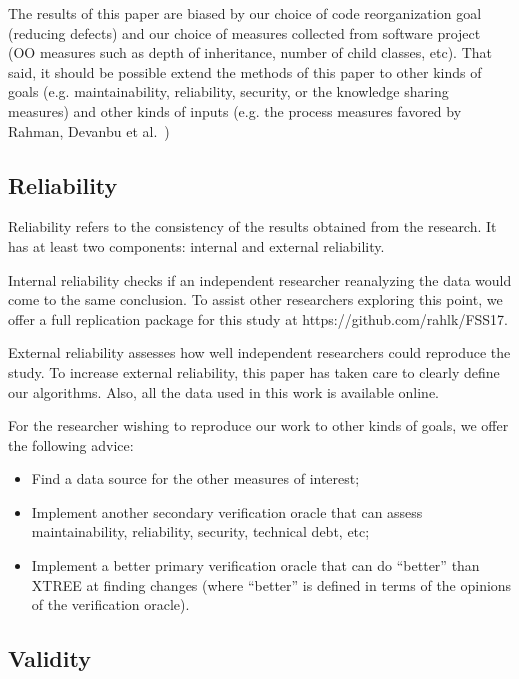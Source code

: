 \documentclass[sigconf, proceedings, 9pt]{acmart}
\begin{document}
\label{sect:valid}



The results of this paper are biased by our choice of code reorganization
goal (reducing defects) and our choice of measures collected from software
project (OO measures such as depth of inheritance, number of child classes,
etc). That said, it should be possible extend the methods of this paper to 
other
kinds of goals (e.g. maintainability, reliability, security, or the 
knowledge sharing
measures) and other kinds of
inputs (e.g. the process measures favored by Rahman,
Devanbu et al.~\cite{Rahman2013})

\subsection{Reliability}
Reliability refers to the consistency of the results obtained
from the research. It has at least two components: internal
and external reliability.

Internal reliability checks if an independent researcher
reanalyzing the data would come to the same conclusion.
To assist other researchers exploring this point, we offer a full 
replication package for this study at
https://github.com/rahlk/FSS17.

External reliability assesses how well independent researchers
could reproduce the study. To increase external
reliability, this paper has taken care to clearly define our
algorithms. Also, all the data used in this work is available
online.

For the researcher wishing to reproduce our work to other kinds of goals, 
we offer the following advice:

\begin{itemize}
\item Find a data source for the other measures of interest;
\item Implement another secondary verification oracle that can assess 
maintainability, reliability, security, technical debt, etc;
\item Implement a better primary verification oracle that can do ``better'' 
than XTREE at finding changes (where ``better'' is defined in terms
of the opinions of the verification oracle). 
\end{itemize}


\subsection{Validity}
\end{document}
